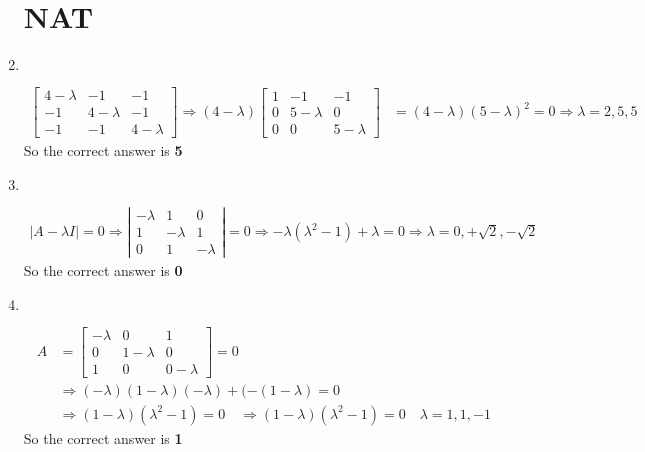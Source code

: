 \begin{enumerate}
	\section{NAT}
		\item $\left. \right. $	
	\begin{answer}
		\begin{align*}
		\left[\begin{array}{ccc}4-\lambda & -1 & -1 \\ -1 & 4-\lambda & -1 \\ -1 & -1 & 4-\lambda\end{array}\right] \Rightarrow(4-\lambda)\left[\begin{array}{ccc}1 & -1 & -1 \\ 0 & 5-\lambda & 0 \\ 0 & 0 & 5-\lambda\end{array}\right]&=(4-\lambda)(5-\lambda)^{2}=0 \Rightarrow \lambda=2,5,5
		\end{align*}
			So the correct answer is \textbf{5}
	\end{answer}
		\item $\left. \right. $	
	\begin{answer}
		\begin{align*}
		|A-\lambda I|=0 \Rightarrow\left|\begin{array}{ccc}-\lambda & 1 & 0 \\ 1 & -\lambda & 1 \\ 0 & 1 & -\lambda\end{array}\right|=0 \Rightarrow-\lambda\left(\lambda^{2}-1\right)+\lambda=0 \Rightarrow \lambda=0,+\sqrt{2},-\sqrt{2}
		\end{align*}
			So the correct answer is \textbf{0}
	\end{answer}
		\item $\left. \right. $	
	\begin{answer}
		\begin{align*}
		A&=\left[\begin{array}{ccc}-\lambda & 0 & 1 \\ 0 & 1-\lambda & 0 \\ 1 & 0 & 0-\lambda\end{array}\right]=0\\
		&\Rightarrow(-\lambda)(1-\lambda)(-\lambda)+(-(1-\lambda)=0\\
		&\Rightarrow(1-\lambda)\left(\lambda^{2}-1\right)=0 \quad \Rightarrow(1-\lambda)\left(\lambda^{2}-1\right)=0 \quad \lambda=1,1,-1
		\end{align*}
		So the correct answer is \textbf{1}
	\end{answer}
	
	
	
	
\end{enumerate}